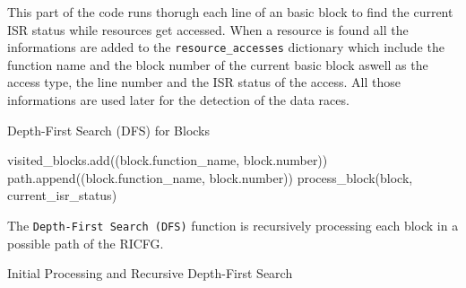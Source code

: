\documentclass[
fancyheadings, %
%
%
]{stsreprt}
\begin{document}
{This part of the code runs thorugh each line of an basic block to find the current ISR status while resources get accessed. When a resource is found all the informations are added to the \texttt{resource\_accesses} dictionary which include the function name and the block number of the current basic block aswell as the access type, the line number and the ISR status of the access. All those informations are used later for the detection of the data races.

\begin{algorithm}[H]
	\caption{Depth-First Search (DFS) for Blocks}
	\DontPrintSemicolon
	\SetAlgoLined
	\BlankLine
	\BlankLine
	visited\_blocks.add((block.function\_name, block.number))\;  %
	path.append((block.function\_name, block.number))\;  %
	\BlankLine
	process\_block(block, current\_isr\_status)\;  %
	\BlankLine
\end{algorithm}

The \texttt{Depth-First Search (DFS)} function is recursively processing each block in a possible path of the RICFG. 

\begin{algorithm}[H]
	\caption{Initial Processing and Recursive Depth-First Search}
	\DontPrintSemicolon
	\SetAlgoLined
	
	\BlankLine
\end{algorithm}


}
\end{document}
